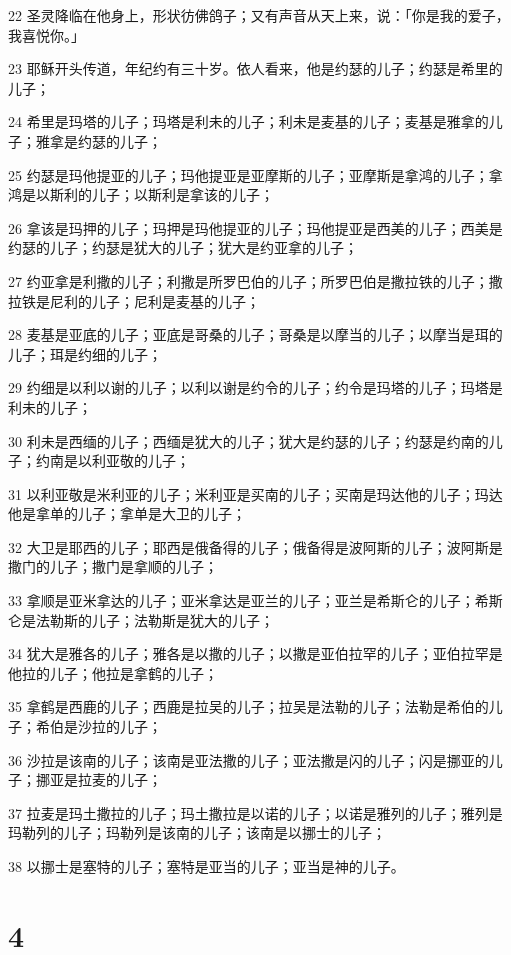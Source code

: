 \par 22 圣灵降临在他身上，形状彷佛鸽子；又有声音从天上来，说：「你是我的爱子，我喜悦你。」
\par 23 耶稣开头传道，年纪约有三十岁。依人看来，他是约瑟的儿子；约瑟是希里的儿子；
\par 24 希里是玛塔的儿子；玛塔是利未的儿子；利未是麦基的儿子；麦基是雅拿的儿子；雅拿是约瑟的儿子；
\par 25 约瑟是玛他提亚的儿子；玛他提亚是亚摩斯的儿子；亚摩斯是拿鸿的儿子；拿鸿是以斯利的儿子；以斯利是拿该的儿子；
\par 26 拿该是玛押的儿子；玛押是玛他提亚的儿子；玛他提亚是西美的儿子；西美是约瑟的儿子；约瑟是犹大的儿子；犹大是约亚拿的儿子；
\par 27 约亚拿是利撒的儿子；利撒是所罗巴伯的儿子；所罗巴伯是撒拉铁的儿子；撒拉铁是尼利的儿子；尼利是麦基的儿子；
\par 28 麦基是亚底的儿子；亚底是哥桑的儿子；哥桑是以摩当的儿子；以摩当是珥的儿子；珥是约细的儿子；
\par 29 约细是以利以谢的儿子；以利以谢是约令的儿子；约令是玛塔的儿子；玛塔是利未的儿子；
\par 30 利未是西缅的儿子；西缅是犹大的儿子；犹大是约瑟的儿子；约瑟是约南的儿子；约南是以利亚敬的儿子；
\par 31 以利亚敬是米利亚的儿子；米利亚是买南的儿子；买南是玛达他的儿子；玛达他是拿单的儿子；拿单是大卫的儿子；
\par 32 大卫是耶西的儿子；耶西是俄备得的儿子；俄备得是波阿斯的儿子；波阿斯是撒门的儿子；撒门是拿顺的儿子；
\par 33 拿顺是亚米拿达的儿子；亚米拿达是亚兰的儿子；亚兰是希斯仑的儿子；希斯仑是法勒斯的儿子；法勒斯是犹大的儿子；
\par 34 犹大是雅各的儿子；雅各是以撒的儿子；以撒是亚伯拉罕的儿子；亚伯拉罕是他拉的儿子；他拉是拿鹤的儿子；
\par 35 拿鹤是西鹿的儿子；西鹿是拉吴的儿子；拉吴是法勒的儿子；法勒是希伯的儿子；希伯是沙拉的儿子；
\par 36 沙拉是该南的儿子；该南是亚法撒的儿子；亚法撒是闪的儿子；闪是挪亚的儿子；挪亚是拉麦的儿子；
\par 37 拉麦是玛土撒拉的儿子；玛土撒拉是以诺的儿子；以诺是雅列的儿子；雅列是玛勒列的儿子；玛勒列是该南的儿子；该南是以挪士的儿子；
\par 38 以挪士是塞特的儿子；塞特是亚当的儿子；亚当是神的儿子。

\chapter{4}

